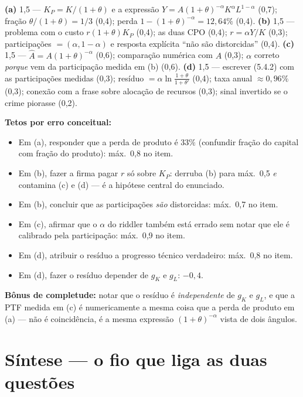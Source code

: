 \documentclass[11pt, a4paper]{article}
\begin{document}
\begin{tcolorbox}[rubricbox]
\small
\textbf{(a)} 1,5 --- $K_P = K/(1+\theta)$ e a expressão
$Y = A(1+\theta)^{-\alpha}K^{\alpha}L^{1-\alpha}$ (0,7); fração $\theta/(1+\theta) = 1/3$
(0,4); perda $1-(1+\theta)^{-\alpha} = 12{,}64\%$ (0,4).
\textbf{(b)} 1,5 --- problema com o custo $r(1+\theta)K_P$ (0,4); as duas CPO (0,4);
$r = \alpha Y/K$ (0,3); participações $=(\alpha,1-\alpha)$ e resposta explícita ``não são
distorcidas'' (0,4).
\textbf{(c)} 1,5 --- $\hat A = A(1+\theta)^{-\alpha}$ (0,6); comparação numérica com $A$
(0,3); $\alpha$ correto \emph{porque} vem da participação medida em (b) (0,6).
\textbf{(d)} 1,5 --- escrever (5.4.2) com as participações medidas (0,3); resíduo
$= \alpha\ln\frac{1+\theta}{1+\theta'}$ (0,4); taxa anual $\approx 0{,}96\%$ (0,3);
conexão com a frase sobre alocação de recursos (0,3); sinal invertido se o crime piorasse
(0,2).

\smallskip
\textbf{Tetos por erro conceitual:}
\begin{itemize}[topsep=2pt]
\item Em (a), responder que a perda de produto é $33\%$ (confundir fração do capital com
      fração do produto): máx.\ 0,8 no item.
\item Em (b), fazer a firma pagar $r$ só sobre $K_P$: derruba (b) para máx.\ 0,5
      \emph{e} contamina (c) e (d) --- é a hipótese central do enunciado.
\item Em (b), concluir que as participações \emph{são} distorcidas: máx.\ 0,7 no item.
\item Em (c), afirmar que o $\alpha$ do riddler também está errado sem notar que ele é
      calibrado pela participação: máx.\ 0,9 no item.
\item Em (d), atribuir o resíduo a progresso técnico verdadeiro: máx.\ 0,8 no item.
\item Em (d), fazer o resíduo depender de $g_K$ e $g_L$: $-0{,}4$.
\end{itemize}
\textbf{Bônus de completude:} notar que o resíduo é \emph{independente} de $g_K$ e $g_L$, e
que a PTF medida em (c) é numericamente a mesma coisa que a perda de produto em (a) --- não
é coincidência, é a mesma expressão $(1+\theta)^{-\alpha}$ vista de dois ângulos.
\end{tcolorbox}

\section*{Síntese --- o fio que liga as duas questões}
\end{document}
